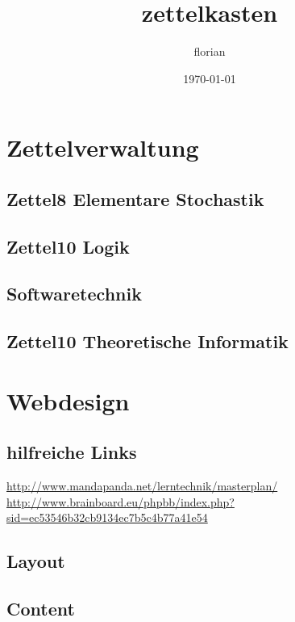 \documentclass[11pt]{article}
\title{zettelkasten}
\author{florian}
\date{\today}
\begin{document}
\maketitle

\setcounter{tocdepth}{3}
\tableofcontents
\vspace*{1cm}



\section{Zettelverwaltung}
\label{sec-1}
\subsection{\textbf{Zettel8} \textbf{Elementare Stochastik}}
\label{sec-1-1}
\subsection{\textbf{Zettel1}0 \textbf{Logik}}
\label{sec-1-2}
\subsection{\textbf{Softwaretechnik}}
\label{sec-1-3}
\subsection{\textbf{Zettel1}0 \textbf{Theoretische Informatik}}
\label{sec-1-4}
\section{Webdesign}
\label{sec-2}
\subsection{hilfreiche Links}
\label{sec-2-1}

\href{http://www.mandapanda.net/lerntechnik/masterplan/}{http://www.mandapanda.net/lerntechnik/masterplan/}
\href{http://www.brainboard.eu/phpbb/index.php?sid=ec53546b32cb9134ec7b5c4b77a41e54}{http://www.brainboard.eu/phpbb/index.php?sid=ec53546b32cb9134ec7b5c4b77a41e54}
\subsection{Layout}
\label{sec-2-2}
\subsection{Content}
\label{sec-2-3}
\end{document}
